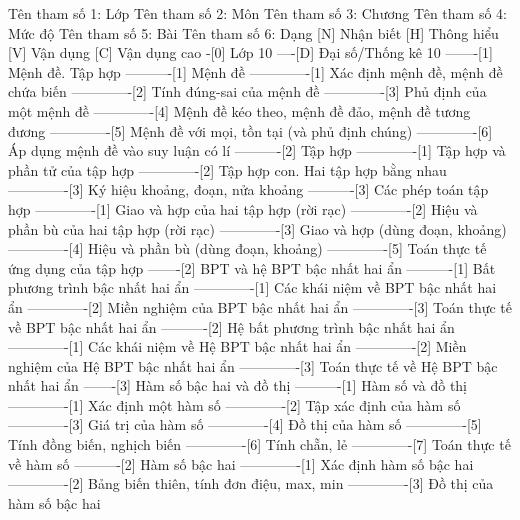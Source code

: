 %
%
%
%
%
Tên tham số 1: Lớp
Tên tham số 2: Môn
Tên tham số 3: Chương
Tên tham số 4: Mức độ
Tên tham số 5: Bài
Tên tham số 6: Dạng
%
%
[N] Nhận biết
[H] Thông hiểu
[V] Vận dụng
[C] Vận dụng cao
%
%
-[0] Lớp 10
----[D] Đại số/Thống kê 10
-------[1] Mệnh đề. Tập hợp
----------[1] Mệnh đề
-------------[1] Xác định mệnh đề, mệnh đề chứa biến
-------------[2] Tính đúng-sai của mệnh đề
-------------[3] Phủ định của một mệnh đề
-------------[4] Mệnh đề kéo theo, mệnh đề đảo, mệnh đề tương đương
-------------[5] Mệnh đề với mọi, tồn tại (và phủ định chúng)
-------------[6] Áp dụng mệnh đề vào suy luận có lí
----------[2] Tập hợp
-------------[1] Tập hợp và phần tử của tập hợp
-------------[2] Tập hợp con. Hai tập hợp bằng nhau
-------------[3] Ký hiệu khoảng, đoạn, nửa khoảng
----------[3] Các phép toán tập hợp
-------------[1] Giao và hợp của hai tập hợp (rời rạc)
-------------[2] Hiệu và phần bù của hai tập hợp (rời rạc)
-------------[3] Giao và hợp (dùng đoạn, khoảng)
-------------[4] Hiệu và phần bù (dùng đoạn, khoảng)
-------------[5] Toán thực tế ứng dụng của tập hợp
-------[2] BPT và hệ BPT bậc nhất hai ẩn
----------[1] Bất phương trình bậc nhất hai ẩn
-------------[1] Các khái niệm về BPT bậc nhất hai ẩn
-------------[2] Miền nghiệm của BPT bậc nhất hai ẩn
-------------[3] Toán thực tế về BPT bậc nhất hai ẩn
----------[2] Hệ bất phương trình bậc nhất hai ẩn
-------------[1] Các khái niệm về Hệ BPT bậc nhất hai ẩn
-------------[2] Miền nghiệm của Hệ BPT bậc nhất hai ẩn
-------------[3] Toán thực tế về Hệ BPT bậc nhất hai ẩn
-------[3] Hàm số bậc hai và đồ thị
----------[1] Hàm số và đồ thị
-------------[1] Xác định một hàm số
-------------[2] Tập xác định của hàm số
-------------[3] Giá trị của hàm số
-------------[4] Đồ thị của hàm số
-------------[5] Tính đồng biến, nghịch biến
-------------[6] Tính chẵn, lẻ
-------------[7] Toán thực tế về hàm số
----------[2] Hàm số bậc hai
-------------[1] Xác định hàm số bậc hai
-------------[2] Bảng biến thiên, tính đơn điệu, max, min
-------------[3] Đồ thị của hàm số bậc hai
